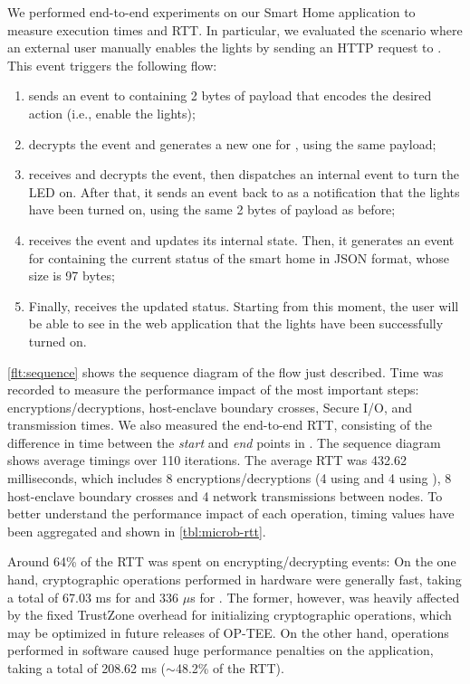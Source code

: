 We performed end-to-end experiments on our Smart Home application to measure
execution times and \ac{RTT}. In particular, we evaluated the scenario where an
external user manually enables the lights by sending an HTTP request to \web.
This event triggers the following flow:
%
\begin{enumerate}
  \item \web{} sends an event to \gateway{} containing 2 bytes of payload that
  encodes the desired action (i.e., enable the lights);
  \item \gateway{} decrypts the event and generates a new one for \light, using
  the same payload;
  \item \light{} receives and decrypts the event, then dispatches an internal
  event to turn the LED on. After that, it sends an event back to \gateway{} as
  a notification that the lights have been turned on, using the same 2 bytes of
  payload as before;
  \item \gateway{} receives the event and updates its internal state. Then, it
  generates an event for \web{} containing the current status of the smart home
  in JSON format, whose size is 97 bytes;
  \item Finally, \web{} receives the updated status. Starting from this moment,
    the user will be able to see in the web application that the lights have
    been successfully turned on.
\end{enumerate}
%
\cref{flt:sequence} shows the sequence diagram of the flow just described. Time
was recorded to measure the performance impact of the most important steps:
encryptions/decryptions, host-enclave boundary crosses, Secure I/O, and
transmission times. We also measured the end-to-end \ac{RTT}, consisting of the
difference in time between the \emph{start} and \emph{end} points in \web. The
sequence diagram shows average timings over 110 iterations. The average \ac{RTT}
was 432.62 milliseconds, which includes 8 encryptions/decryptions (4 using
\aes{} and 4 using \spongent), 8 host-enclave boundary crosses and 4 network
transmissions between nodes. To better understand the performance impact of each
operation, timing values have been aggregated and shown in
\cref{tbl:microb-rtt}.

Around 64\% of the \ac{RTT} was spent on encrypting/decrypting events: On the
one hand, cryptographic operations performed in hardware were generally fast,
taking a total of 67.03 ms for \aes{} and 336 $\mu$s for \spongent. The former,
however, was heavily affected by the fixed TrustZone overhead for initializing
cryptographic operations, which may be optimized in future releases of OP-TEE.
On the other hand, \spongent{} operations performed in software caused huge
performance penalties on the application, taking a total of 208.62 ms
($\sim$48.2\% of the \ac{RTT}).

